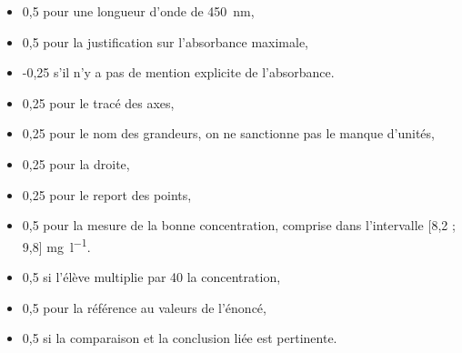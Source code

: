 \begin{multicols}{2}
\numeroQuestion
\begin{itemize}
  \item 0,5 pour une longueur d'onde de \qty{450}{\nm},
  \item 0,5 pour la justification sur l'absorbance maximale,
  \item -0,25 s'il n'y a pas de mention explicite de l'absorbance.
\end{itemize}

\numeroQuestion
\begin{itemize}
  \item 0,25 pour le tracé des axes,
  \item 0,25 pour le nom des grandeurs, on ne sanctionne pas le manque d'unités,
  \item 0,25 pour la droite,
  \item 0,25 pour le report des points,
  \item 0,5 pour la mesure de la bonne concentration, comprise dans l'intervalle [8,2 ; 9,8] \unit{\mg\per\litre}.
\end{itemize}

\numeroQuestion
\begin{itemize}
  \item 0,5 si l'élève multiplie par 40 la concentration,
  \item 0,5 pour la référence au valeurs de l'énoncé,
  \item 0,5 si la comparaison et la conclusion liée est pertinente.
\end{itemize}
\end{multicols}